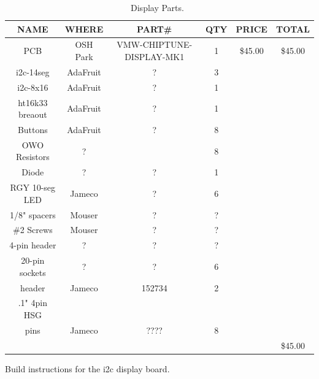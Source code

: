 \documentclass[11pt]{article}
\begin{document}
\begin{table}

\caption{Display Parts.~\label{table:display_parts}}
\centering
\begin{tabular}{|c|c|c|c|c|c|}
\hline
NAME		& WHERE		& PART\#	           & QTY & PRICE    & TOTAL \\
\hline
\hline
PCB		& OSH Park	& VMW-CHIPTUNE-DISPLAY-MK1 & 1	 & \$45.00  & \$45.00 \\
\hline
i2c-14seg	& AdaFruit	& ?		& 3	&		&	\\
\hline
i2c-8x16	& AdaFruit	& ?		& 1	&		&	\\
\hline
ht16k33 breaout	& AdaFruit	& ?		& 1	&		&	\\
\hline
Buttons		& AdaFruit	& ?		& 8	&		&	\\
\hline
OWO Resistors	& ?		& 		& 8	& 		&	\\
\hline
Diode		& ?		& ?		& 1	& 		&	\\
\hline
RGY 10-seg LED	& Jameco	& ?		& 6	& 		&	\\
\hline
1/8" spacers	& Mouser	& ?		& ?	& 		&	\\
\hline
\#2 Screws	& Mouser	& ?		& ?	& 		&	\\
\hline
4-pin header	& ?		& ?		& ?	& 		&	\\
\hline
20-pin sockets	& ?		& ?		& 6	& 		&	\\
\hline
header		& Jameco	& 152734	& 2	& 		&	\\
.1" 4pin HSG	& 		&		&	&		&	\\
\hline
pins		& Jameco	& ????		& 8	&		&	\\
\hline
\hline
		&		&		&	&		& \$45.00 \\
\hline
\end{tabular}
\end{table}

Build instructions for the i2c display board.
\end{document}
